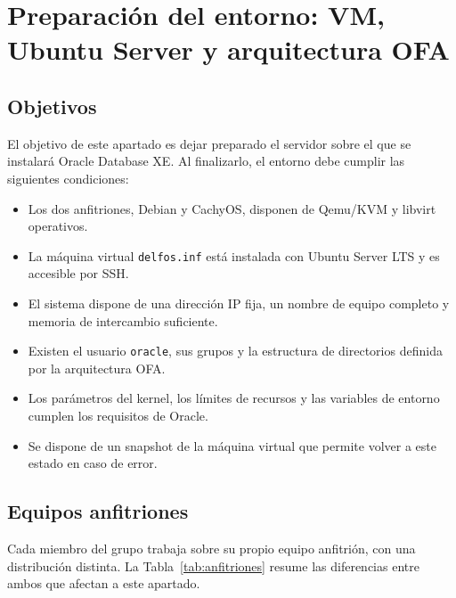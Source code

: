 
\section{Preparación del entorno: VM, Ubuntu Server y arquitectura OFA}

\subsection{Objetivos}

El objetivo de este apartado es dejar preparado el servidor sobre el que se instalará Oracle Database XE. Al finalizarlo, el entorno debe cumplir las siguientes condiciones:

\begin{itemize}
    \item Los dos anfitriones, Debian y CachyOS, disponen de Qemu/KVM y libvirt operativos.
    \item La máquina virtual \texttt{delfos.inf} está instalada con Ubuntu Server LTS y es accesible por SSH.
    \item El sistema dispone de una dirección IP fija, un nombre de equipo completo y memoria de intercambio suficiente.
    \item Existen el usuario \texttt{oracle}, sus grupos y la estructura de directorios definida por la arquitectura OFA.
    \item Los parámetros del kernel, los límites de recursos y las variables de entorno cumplen los requisitos de Oracle.
    \item Se dispone de un snapshot de la máquina virtual que permite volver a este estado en caso de error.
\end{itemize}

\subsection{Equipos anfitriones}

Cada miembro del grupo trabaja sobre su propio equipo anfitrión, con una distribución distinta. La Tabla~\ref{tab:anfitriones} resume las diferencias entre ambos que afectan a este apartado.

